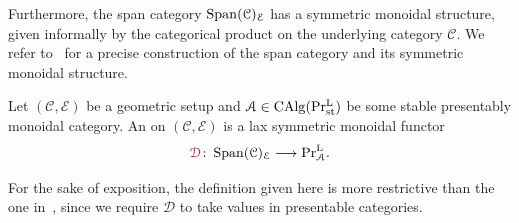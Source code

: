 Furthermore, the span category $\operatorname{\mathrm{Span}}({\mathcal C})_{\mathcal E}$ has a symmetric monoidal structure, given informally by the categorical product on the underlying category $\mathcal C$. We refer to~\cites[][Definition 6.1.1]{Liu_Zheng2012}[][Definition~A.5.2 and Remark A.5.5]{Mann2022} for a precise construction of the span category and its symmetric monoidal structure.
\begin{defn}\label{defn:six-func}
  Let $(\mathcal C, \mathcal E)$ be a geometric setup and $\mathcal{A}\in \operatorname{CAlg}(\operatorname{Pr^L_{st}})$ be some stable presentably monoidal category. 
  An  on 
  $(\mathcal C,\mathcal E)$ is a lax symmetric monoidal functor
  \[
    \mdef{\cD}\colon\Span{\mathcal C}_{\mathcal E}\longrightarrow
    \mathrm{Pr}^{\mathrm{L}}_{\mathcal A}.
  \]
\end{defn}
For the sake of exposition, the definition given here is more restrictive than the one in~\cite{Mann2022}, since we require $\mathcal D$ to take values in presentable categories.

\medskip

